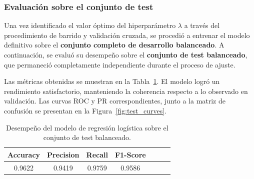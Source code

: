 \documentclass[11pt]{article}
\begin{document}
\subsubsection*{Evaluación sobre el conjunto de test}

Una vez identificado el valor óptimo del hiperparámetro $\lambda$ a través del procedimiento de barrido y validación cruzada, se procedió a entrenar el modelo definitivo sobre el \textbf{conjunto completo de desarrollo balanceado}. A continuación, se evaluó su desempeño sobre el \textbf{conjunto de test balanceado}, que permaneció completamente independiente durante el proceso de ajuste.

Las métricas obtenidas se muestran en la Tabla~\ref{tab:test_metrics}. El modelo logró un rendimiento satisfactorio, manteniendo la coherencia respecto a lo observado en validación. Las curvas ROC y PR correspondientes, junto a la matriz de confusión se presentan en la Figura~\ref{fig:test_curves}.

\begin{table}[H]
    \centering
    \begin{tabular}{lcccccc}
        \toprule
        \textbf{Accuracy} & \textbf{Precision} & \textbf{Recall} & \textbf{F1-Score} \\
        \midrule
        \multicolumn{1}{c}{0.9622} & \multicolumn{1}{c}{0.9419} & \multicolumn{1}{c}{0.9759} & \multicolumn{1}{c}{0.9586} \\
        \bottomrule
    \end{tabular}
    \caption{Desempeño del modelo de regresión logística sobre el conjunto de test balanceado.}
    \label{tab:test_metrics}
\end{table}
\end{document}
